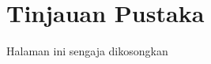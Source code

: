 \chapter{Tinjauan Pustaka}













\newpage
\thispagestyle{empty}
\vspace*{\fill}
    \begin{center}
	Halaman ini sengaja dikosongkan
    \end{center}
\vspace*{\fill}
\pagebreak

